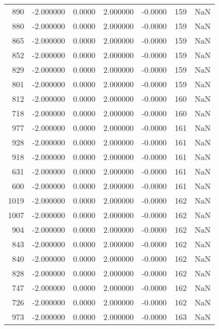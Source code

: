 \begin{tabular}{rrrrrrr}
 890 &   -2.000000 &    0.0000 &    2.000000 &     -0.0000 &         159 & NaN \\
 880 &   -2.000000 &    0.0000 &    2.000000 &     -0.0000 &         159 & NaN \\
 865 &   -2.000000 &    0.0000 &    2.000000 &     -0.0000 &         159 & NaN \\
 852 &   -2.000000 &    0.0000 &    2.000000 &     -0.0000 &         159 & NaN \\
 829 &   -2.000000 &    0.0000 &    2.000000 &     -0.0000 &         159 & NaN \\
 801 &   -2.000000 &    0.0000 &    2.000000 &     -0.0000 &         159 & NaN \\
 812 &   -2.000000 &    0.0000 &    2.000000 &     -0.0000 &         160 & NaN \\
 718 &   -2.000000 &    0.0000 &    2.000000 &     -0.0000 &         160 & NaN \\
 977 &   -2.000000 &    0.0000 &    2.000000 &     -0.0000 &         161 & NaN \\
 928 &   -2.000000 &    0.0000 &    2.000000 &     -0.0000 &         161 & NaN \\
 918 &   -2.000000 &    0.0000 &    2.000000 &     -0.0000 &         161 & NaN \\
 631 &   -2.000000 &    0.0000 &    2.000000 &     -0.0000 &         161 & NaN \\
 600 &   -2.000000 &    0.0000 &    2.000000 &     -0.0000 &         161 & NaN \\
1019 &   -2.000000 &    0.0000 &    2.000000 &     -0.0000 &         162 & NaN \\
1007 &   -2.000000 &    0.0000 &    2.000000 &     -0.0000 &         162 & NaN \\
 904 &   -2.000000 &    0.0000 &    2.000000 &     -0.0000 &         162 & NaN \\
 843 &   -2.000000 &    0.0000 &    2.000000 &     -0.0000 &         162 & NaN \\
 840 &   -2.000000 &    0.0000 &    2.000000 &     -0.0000 &         162 & NaN \\
 828 &   -2.000000 &    0.0000 &    2.000000 &     -0.0000 &         162 & NaN \\
 747 &   -2.000000 &    0.0000 &    2.000000 &     -0.0000 &         162 & NaN \\
 726 &   -2.000000 &    0.0000 &    2.000000 &     -0.0000 &         162 & NaN \\
 973 &   -2.000000 &    0.0000 &    2.000000 &     -0.0000 &         163 & NaN \\

\end{tabular}
